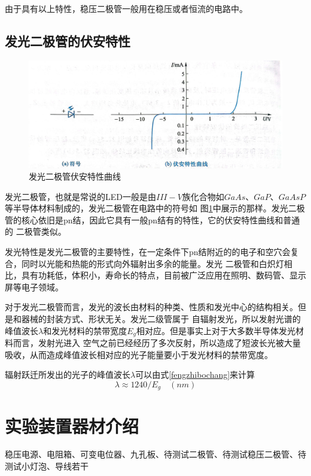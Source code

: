 \documentclass{ctexart}
\begin{document}
  由于具有以上特性，稳压二极管一般用在稳压或者恒流的电路中。

  \subsection{发光二极管的伏安特性}
  \begin{figure}[b]
    \centering
    \includegraphics[width=1\textwidth]{faguangfuantexing.jpg}
    \caption{发光二极管伏安特性曲线}\label{faguangfuantexing}
  \end{figure}
  发光二极管，也就是常说的LED一般是由$III-V$族化合物如$GaAs$、$GaP$、$GaAsP$等半导体材料制成的，发光二极管在电路中的符号如
  图\ref{faguangfuantexing}中展示的那样。发光二极管的核心依旧是pn结，因此它具有一般pn结有的特性，它的伏安特性曲线和普通的
  二极管类似。
  
  发光特性是发光二极管的主要特性，在一定条件下pn结附近的的电子和空穴会复合，同时以光能和热能的形式向外辐射出多余的能量。发光
  二极管和白炽灯相比，具有功耗低，体积小，寿命长的特点，目前被广泛应用在照明、数码管、显示屏等电子领域。

  对于发光二极管而言，发光的波长由材料的种类、性质和发光中心的结构相关。但是和器械的封装方式、形状无关。发光二级管属于
  自辐射发光，所以发射光谱的峰值波长$\lambda$和发光材料的禁带宽度$E_{g}$相对应。但是事实上对于大多数半导体发光材料而言，发射光进入
  空气之前已经经历了多次反射，所以造成了短波长光被大量吸收，从而造成峰值波长相对应的光子能量要小于发光材料的禁带宽度。

  辐射跃迁所发出的光子的峰值波长$\lambda$可以由式\ref{fengzhibochang}来计算
  \begin{equation}
    \lambda \approx 1240/E_{g} \quad (nm)
  \end{equation}

\section{实验装置器材介绍}
稳压电源、电阻箱、可变电位器、九孔板、待测试二极管、待测试稳压二极管、待测试小灯泡、导线若干
\end{document}
